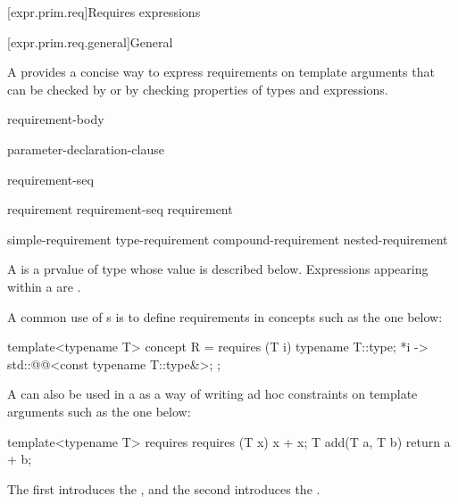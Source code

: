 [expr.prim.req]{Requires expressions}

[expr.prim.req.general]{General}
%

\pnum
A  provides a concise way to express
requirements on template arguments
that can be checked by 
or by checking properties of types and expressions.

\begin{bnf}
\br
      requirement-body
\end{bnf}

\begin{bnf}
\br
    \terminal{(} parameter-declaration-clause \terminal{)}
\end{bnf}

\begin{bnf}
\br
    \terminal{\{} requirement-seq \terminal{\}}
\end{bnf}

\begin{bnf}
\br
    requirement\br
    requirement-seq requirement
\end{bnf}

\begin{bnf}
\br
    simple-requirement\br
    type-requirement\br
    compound-requirement\br
    nested-requirement
\end{bnf}

\pnum
A  is a prvalue of type 
whose value is described below.
Expressions appearing within a 
are .

\pnum
\begin{example}
A common use of s is to define
requirements in concepts such as the one below:
\begin{codeblock}
template<typename T>
  concept R = requires (T i) {
    typename T::type;
    {*i} -> std::@@<const typename T::type&>;
  };
\end{codeblock}
A  can also be used in a
 as a way of writing ad hoc
constraints on template arguments such as the one below:
\begin{codeblock}
template<typename T>
  requires requires (T x) { x + x; }
    T add(T a, T b) { return a + b; }
\end{codeblock}
The first  introduces the
, and the second
introduces the .
\end{example}

